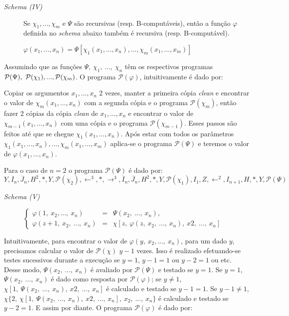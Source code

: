 \documentclass[10pt,letterpaper]{article}
\begin{document}
\begin{description}
\item[\textit{Schema (IV)}] Se $\chi_1, ..., \chi_m$ e $\Psi$ s\~{a}o recursivas (resp. B-comput\'aveis), ent\~{a}o a fun\c{c}\~{a}o $\varphi$ definida no \textit{schema} abaixo tamb\'em \'e recursiva (resp. B-comput\'avel).
\begin{center}
$\varphi(x_1, ..., x_n) = \Psi[\chi_1(x_1, ..., x_n), ..., \chi_m(x_1, ..., x_m)]$
\end{center}
\end{description}

Assumindo que as fun\c{c}\~{o}es $\Psi,\ \chi_1,\ ...,\ \chi_n$ t\^em os respectivos programas $\mathcal{P}(\Psi),\ \mathcal{P}(\chi_1),\\ ...,\mathcal{P}(\chi_m)$. O programa $\mathcal{P}(\varphi)$, intuitivamente \'e dado por:

Copiar os argumentos $x_1, ..., x_n$ 2 vezes, manter a primeira c\'opia \textit{clean} e encontrar o valor de $\chi_m(x_1, ..., x_n)$ com a segunda c\'opia e o programa $\mathcal{P}(\chi_m)$, ent\~{a}o fazer 2 c\'opias da c\'opia \textit{clean} de $x_1, ..., x_n$ e encontrar o valor de $\chi_{m-1}(x_1, ..., x_n)$ com uma c\'opia e o programa  $\mathcal{P}(\chi_{m-1})$. Esses passos s\~{a}o feitos at\'e que se chegue $\chi_1(x_1, ..., x_n)$. Ap\'os estar com todos os par\^ametros $\chi_1(x_1, ..., x_n), ..., \chi_m(x_1, ..., x_m)$ aplica-se o programa $\mathcal{P}(\Psi)$ e teremos o valor de $\varphi(x_1, ..., x_n)$.

Para o caso de $n = 2$ o programa $\mathcal{P}(\Psi)$ \'e dado por:
$$Y, \overline{I}_n, \overline{J}_n, H^2, *, Y, \mathcal{P}(\chi_2), \leftarrow^3, *, \rightarrow^3, \overline{I}_n, \overline{J}_n, H^2, *, Y, \mathcal{P}(\chi_1), I_1, Z, \leftarrow^2, I_{n+1}, H, *, Y, \mathcal{P}(\Psi)$$

\begin{description}
\item[\textit{Schema (V)}] 
$
\left\{\begin{array}{rrr}
\varphi(1,\ x_2, ...,\ x_n) & = &\Psi(x_2,\ ...,\ x_n),\\
\varphi(z+1,\ x_2,\ ...,\ x_n) & = & \chi[z,\ \varphi(z,\ x_2,\ ...,\ x_n),\ x2,\ ...,\ x_n ]
\end{array}\right.
$
\end{description}

Intuitivamente, para encontrar o valor de $\varphi(y,\ x_2, ...,\ x_n)$, para um dado $y$, precisamos calcular o valor de $\mathcal{P}(\chi)$ $y-1$ vezes. Isso \'e realizado efetuando-se testes sucessivos durante a execu\c{c}\~{a}o se $y=1$, $y-1 = 1$ ou $y-2 = 1$ ou etc. Desse modo, $\Psi(x_2,\ ...,\ x_n)$ \'e avaliado por $\mathcal{P}(\Psi)$ e testado se $y=1$. Se $y=1$, $\Psi(x_2,\ ...,\ x_n)$ \'e dado como resposta por $\mathcal{P}(\varphi)$; se $y \neq 1$, $\chi[1,\ \Psi(x_2,\ ...,\ x_n),\ x2,\ ...,\ x_n ]$ \'e calculado e testado se $y-1 = 1$. Se $y-1 \neq 1$, $\chi\{2,\ \chi[1,\ \Psi(x_2,\ ...,\ x_n),\ x2,\ ...,\ x_n ],\ x_2,\ ...,\ x_n \}$ \'e calculado e testado se $y-2=1$. E assim por diante. O programa $\mathcal{P}(\varphi)$ \'e dado por:\\
\end{document}

